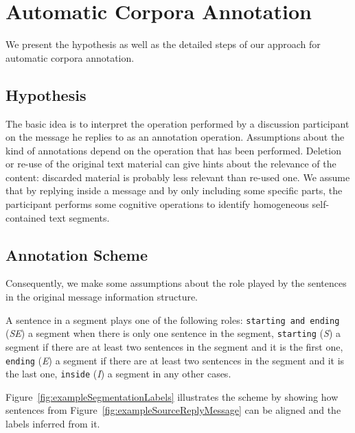 
\chapter{Automatic Corpora Annotation}

We present the hypothesis as well as the detailed steps of our approach for automatic corpora annotation.

\section{Hypothesis}

The basic idea is to interpret the operation performed by a discussion participant on the message he replies to as an annotation operation. 
% 
Assumptions about the kind of annotations depend on the operation that has been performed.
% 
Deletion or re-use of the original text material can give hints about the relevance of the content: discarded material is probably less relevant than re-used one.
% 
We assume that by replying inside a message and by only including some specific parts, the participant performs some cognitive operations to identify homogeneous self-contained text segments.

\section{Annotation Scheme}

Consequently, we make some assumptions about the role played by the sentences in the original message information structure.

A sentence in a segment plays one of the following roles:
\texttt{\footnotesize starting and ending} (\textit{SE}) a segment when there is only one sentence in the segment, %
\texttt{\footnotesize starting} (\textit{S}) a segment if there are at least two sentences in the segment and it is the first one, %
\texttt{\footnotesize ending} (\textit{E}) a segment if there are at least two sentences in the segment and it is the last one, %
\texttt{\footnotesize inside} (\textit{I}) a segment in any other cases.

Figure~\ref{fig:exampleSegmentationLabels} illustrates the scheme by showing how sentences from Figure~\ref{fig:exampleSourceReplyMessage} can be aligned and the labels inferred from it. 
% 

